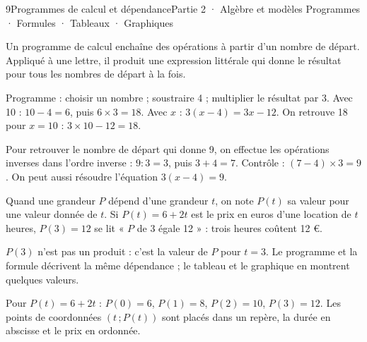 \begin{ouverture}[courbe]{9}{Programmes de calcul et dépendance}{Partie 2 · Algèbre et modèles}
{Programmes · Formules · Tableaux · Graphiques}
\end{ouverture}
\pagestyle{otMain}\essentiel\fontsize{11}{15}\selectfont
{}\label{cours-9-1}
\begin{definition}Un programme de calcul enchaîne des opérations à partir d’un nombre de départ. Appliqué à une lettre, il produit une expression littérale qui donne le résultat pour tous les nombres de départ à la fois.\end{definition}
\begin{exemple}Programme : choisir un nombre ; soustraire 4 ; multiplier le résultat par 3. Avec 10 : $10-4=6$, puis $6\times3=18$. Avec $x$ : $3(x-4)=3x-12$. On retrouve 18 pour $x=10$ : $3\times10-12=18$.\end{exemple}
\begin{savoirfaire}Pour retrouver le nombre de départ qui donne 9, on effectue les opérations inverses dans l’ordre inverse : $9:3=3$, puis $3+4=7$. Contrôle : $(7-4)\times3=9$. On peut aussi résoudre l’équation $3(x-4)=9$.\end{savoirfaire}
\begin{definition}Quand une grandeur $P$ dépend d’une grandeur $t$, on note $P(t)$ sa valeur pour une valeur donnée de $t$. Si $P(t)=6+2t$ est le prix en euros d’une location de $t$ heures, $P(3)=12$ se lit « $P$ de 3 égale 12 » : trois heures coûtent 12 €.\end{definition}
\begin{attention}$P(3)$ n’est pas un produit : c’est la valeur de $P$ pour $t=3$. Le programme et la formule décrivent la même dépendance ; le tableau et le graphique en montrent quelques valeurs.\end{attention}
\clearpage
{}\label{cours-9-2}
\begin{exemple}Pour $P(t)=6+2t$ : $P(0)=6$, $P(1)=8$, $P(2)=10$, $P(3)=12$. Les points de coordonnées $(t\,;P(t))$ sont placés dans un repère, la durée en abscisse et le prix en ordonnée.\end{exemple}
\label{fig-cours-9-2-cours-location}


